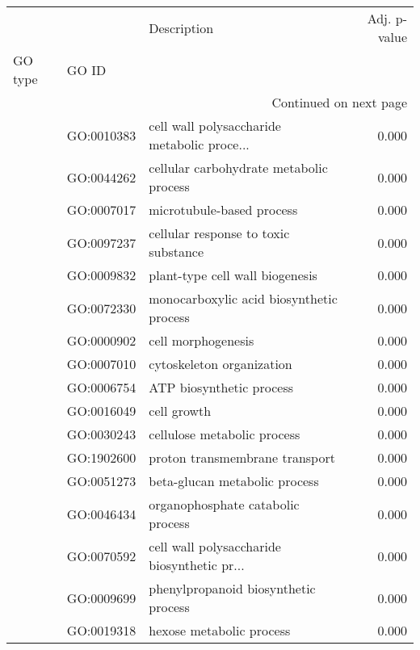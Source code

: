 \begin{longtable}{lllr}
\toprule
   &            &                                  Description &  Adj. p-value \\
GO type & GO ID &                                              &               \\
\midrule
\endhead
\midrule
\multicolumn{4}{r}{{Continued on next page}} \\
\midrule
\endfoot

\bottomrule
\endlastfoot
\multirow{211}{*}{BP} & GO:0010383 &  cell wall polysaccharide metabolic proce... &         0.000 \\
   & GO:0044262 &      cellular carbohydrate metabolic process &         0.000 \\
   & GO:0007017 &                    microtubule-based process &         0.000 \\
   & GO:0097237 &         cellular response to toxic substance &         0.000 \\
   & GO:0009832 &              plant-type cell wall biogenesis &         0.000 \\
   & GO:0072330 &     monocarboxylic acid biosynthetic process &         0.000 \\
   & GO:0000902 &                           cell morphogenesis &         0.000 \\
   & GO:0007010 &                    cytoskeleton organization &         0.000 \\
   & GO:0006754 &                     ATP biosynthetic process &         0.000 \\
   & GO:0016049 &                                  cell growth &         0.000 \\
   & GO:0030243 &                  cellulose metabolic process &         0.000 \\
   & GO:1902600 &               proton transmembrane transport &         0.000 \\
   & GO:0051273 &                beta-glucan metabolic process &         0.000 \\
   & GO:0046434 &            organophosphate catabolic process &         0.000 \\
   & GO:0070592 &  cell wall polysaccharide biosynthetic pr... &         0.000 \\
   & GO:0009699 &         phenylpropanoid biosynthetic process &         0.000 \\
   & GO:0019318 &                     hexose metabolic process &         0.000 \\

\end{longtable}
